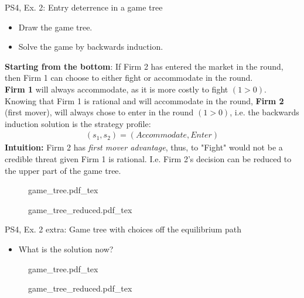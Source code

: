 \begin{frame}{PS4, Ex. 2: Entry deterrence in a game tree}
  \begin{multicols}{2}
    \begin{itemize}
      \item[(a)] Draw the game tree.
      \item[(b)] Solve the game by backwards induction.
    \end{itemize}
    \textbf{Starting from the bottom}: If Firm 2 has entered the market in the  round, then Firm 1 can choose to either fight or accommodate in the  round.\\\medskip
    \textbf{Firm 1} will always accommodate, as it is more costly to fight $(1>0)$.\\\medskip
    Knowing that Firm 1 is rational and will accommodate in the  round, \textbf{Firm 2} (first mover), will always chose to enter in the  round $(1>0)$, i.e. the backwards induction solution is the strategy profile:
      \begin{align*}
        (s_1,s_2)=(Accommodate,Enter)
      \end{align*}
    \textbf{Intuition:} Firm 2 has \textit{first mover advantage}, thus, to "Fight" would not be a credible threat given Firm 1 is rational. I.e. Firm 2's decision can be reduced to the upper part of the game tree.
  \vfill\null \columnbreak
    \begin{figure}[!h]
      \begin{center}
      \def\svgwidth{1.0\columnwidth}
      {game_tree.pdf_tex}
      \end{center}
    \end{figure}
    \begin{figure}[!h]
      \begin{center}
      \def\svgwidth{1.0\columnwidth}
      {game_tree_reduced.pdf_tex}
      \end{center}
    \end{figure}
  \vfill\null
  \end{multicols}
\end{frame}
\begin{frame}{PS4, Ex. 2 extra: Game tree with choices off the equilibrium path}
  \begin{multicols}{2}
    \begin{itemize}
      \item[(a)] What is the solution now?
    \end{itemize}
  \vfill\null \columnbreak
    \begin{figure}[!h]
      \begin{center}
      \def\svgwidth{1.0\columnwidth}
      {game_tree.pdf_tex}
      \end{center}
    \end{figure}
    \begin{figure}[!h]
      \begin{center}
      \def\svgwidth{1.0\columnwidth}
      {game_tree_reduced.pdf_tex}
      \end{center}
    \end{figure}
  \vfill\null
  \end{multicols}
\end{frame}

